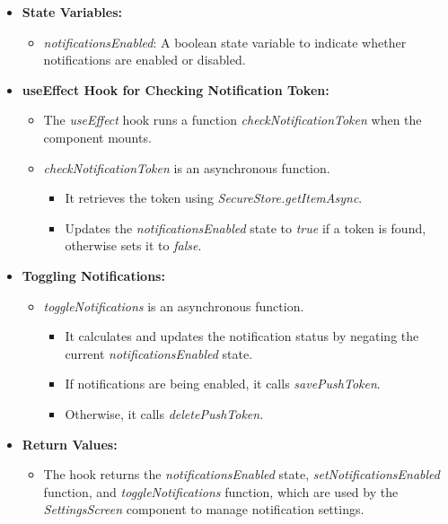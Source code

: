 \begin{itemize}
    \item \textbf{State Variables:}
    \begin{itemize}
        \item \textit{notificationsEnabled}: A boolean state variable to indicate whether notifications are enabled or disabled.
    \end{itemize}

    \item \textbf{useEffect Hook for Checking Notification Token:}
    \begin{itemize}
        \item The \textit{useEffect} hook runs a function \textit{checkNotificationToken} when the component mounts.
        \item \textit{checkNotificationToken} is an asynchronous function.
        \begin{itemize}
            \item It retrieves the token using \textit{SecureStore.getItemAsync}.
            \item Updates the \textit{notificationsEnabled} state to \textit{true} if a token is found, otherwise sets it to \textit{false}.
        \end{itemize}
    \end{itemize}

    \item \textbf{Toggling Notifications:}
    \begin{itemize}
        \item \textit{toggleNotifications} is an asynchronous function.
        \begin{itemize}
            \item It calculates and updates the notification status by negating the current \textit{notificationsEnabled} state.
            \item If notifications are being enabled, it calls \textit{savePushToken}.
            \item Otherwise, it calls \textit{deletePushToken}.
        \end{itemize}
    \end{itemize}

    \item \textbf{Return Values:}
    \begin{itemize}
        \item The hook returns the \textit{notificationsEnabled} state, \textit{setNotificationsEnabled} function, and \textit{toggleNotifications} function, which are used by the \textit{SettingsScreen} component to manage notification settings.
    \end{itemize}
\end{itemize}

